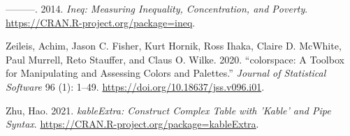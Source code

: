 \begin{CSLReferences}{1}{0}
\leavevmode{}%
---------. 2014. \emph{Ineq: Measuring Inequality, Concentration, and Poverty}. \url{https://CRAN.R-project.org/package=ineq}.

\leavevmode{}%
Zeileis, Achim, Jason C. Fisher, Kurt Hornik, Ross Ihaka, Claire D. McWhite, Paul Murrell, Reto Stauffer, and Claus O. Wilke. 2020. {``{colorspace}: A Toolbox for Manipulating and Assessing Colors and Palettes.''} \emph{Journal of Statistical Software} 96 (1): 1--49. \url{https://doi.org/10.18637/jss.v096.i01}.

\leavevmode{}%
Zhu, Hao. 2021. \emph{kableExtra: Construct Complex Table with 'Kable' and Pipe Syntax}. \url{https://CRAN.R-project.org/package=kableExtra}.

\end{CSLReferences}



\address{%
Emi Tanaka\\
Monash University\\%
Department of Econometrics and Business Statistics\\ Monash University, Clayton, VIC 3800\\
%
\url{https://emitanaka.org/}\\%
\textit{ORCiD: \href{https://orcid.org/0000-0002-1455-259X}{0000-0002-1455-259X}}\\%
\href{mailto:emi.tanaka@monash.edu}{\nolinkurl{emi.tanaka@monash.edu}}%
}

\address{%
Dewi Amaliah\\
Monash University\\%
Department of Econometrics and Business Statistics\\ Monash University, Clayton, VIC 3800\\
%
%
%
%
}
